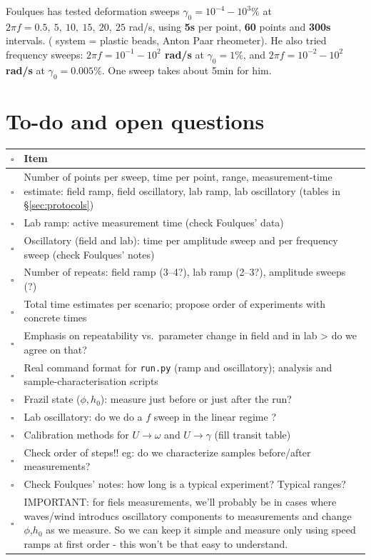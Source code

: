 \documentclass[a4paper,11pt]{article}
\newcommand{\code}[1]{\texttt{#1}}
\begin{document}
Foulques has tested deformation sweeps \textbf{ $\gamma_0 = 10^{-4}-10^3 \%$} at $2\pi f = 0.5, ~ 5, ~10, ~15, ~20, ~25 $ rad/s, using \textbf{5s} per point, \textbf{60} points and \textbf{300s} intervals.  ( system  = plastic beads, Anton Paar rheometer). He also tried frequency sweeps: \textbf{$2\pi f = 10^{-1} - 10^{2}$ rad/s} at $\gamma_0 = 1\%$, and \textbf{$2\pi f = 10^{-2} - 10^{2}$ rad/s} at $\gamma_0 = 0.005\%$. One sweep takes about 5min for him. 


\section{To-do and open questions}
\begin{table}[H]
\centering
\begin{tabularx}{\textwidth}{@{}c Y@{}}
\toprule
$\square$ & \textbf{Item} \\
\midrule
$\square$ & Number of points per sweep, time per point, range, measurement-time estimate: field ramp, field oscillatory, lab ramp, lab oscillatory (tables in \S\ref{sec:protocols}) \\
$\square$ & Lab ramp: active measurement time (check Foulques' data) \\
$\square$ & Oscillatory (field and lab): time per amplitude sweep and per frequency sweep (check Foulques' notes) \\
$\square$ & Number of repeats: field ramp (3--4?), lab ramp (2--3?), amplitude sweeps (?) \\
$\square$ & Total time estimates per scenario; propose order of experiments with concrete times \\
$\square$ & Emphasis on repeatability vs.\ parameter change in field and in lab > do we agree on that?\\
$\square$ & Real command format for \code{run.py} (ramp and oscillatory); analysis and sample-characterisation scripts \\
$\square$ & Frazil state ($\phi,h_0$): measure just before or just after the run? \\
$\square$ & Lab oscillatory: do we do a  $f$ sweep in the linear regime ? \\
$\square$ & Calibration methods for $U\to\omega$ and $U\to\gamma$ (fill transit table) \\
$\square$ & Check order of steps!! eg: do we characterize samples before/after measurements? \\
$\square$ & Check Foulques' notes: how long is a typical experiment? Typical ranges?  \\
$\square$ & IMPORTANT: for fiels measurements, we'll probably be in cases where waves/wind introducs oscillatory components to measurements and change $\phi$,$h_0$ as we measure. So we can keep it simple and measure only using speed ramps at first order - this won't be that easy to understand.  \\
\bottomrule
\end{tabularx}
\end{table}
\end{document}
